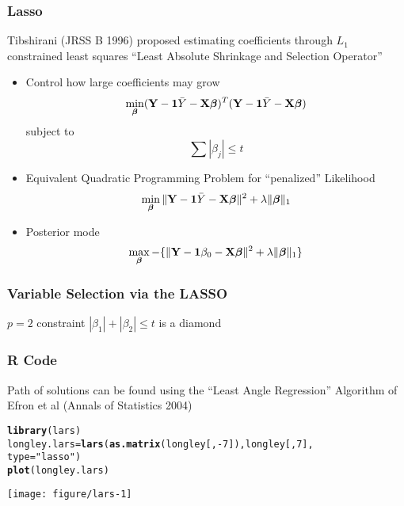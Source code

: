 \documentclass[handout]{beamer}\usepackage[]{graphicx}\usepackage[]{color}
\makeatletter
\def\maxwidth{ %
  \ifdim\Gin@nat@width>\linewidth
    \linewidth
  \else
    \Gin@nat@width
  \fi
}
\newcommand{\hlnum}[1]{\textcolor[rgb]{0.686,0.059,0.569}{#1}}%
\newcommand{\hlstr}[1]{\textcolor[rgb]{0.192,0.494,0.8}{#1}}%
\newcommand{\hlopt}[1]{\textcolor[rgb]{0,0,0}{#1}}%
\newcommand{\hlstd}[1]{\textcolor[rgb]{0.345,0.345,0.345}{#1}}%
\newcommand{\hlkwb}[1]{\textcolor[rgb]{0.69,0.353,0.396}{#1}}%
\newcommand{\hlkwc}[1]{\textcolor[rgb]{0.333,0.667,0.333}{#1}}%
\newcommand{\hlkwd}[1]{\textcolor[rgb]{0.737,0.353,0.396}{\textbf{#1}}}%
\newenvironment{kframe}{%
 \def\at@end@of@kframe{}%
 \ifinner\ifhmode%
  \def\at@end@of@kframe{\end{minipage}}%
  \begin{minipage}{\columnwidth}%
 \fi\fi%
 \def\FrameCommand##1{\hskip\@totalleftmargin \hskip-\fboxsep
 \colorbox{shadecolor}{##1}\hskip-\fboxsep
     \hskip-\linewidth \hskip-\@totalleftmargin \hskip\columnwidth}%
 \MakeFramed {\advance\hsize-\width
   \@totalleftmargin\z@ \linewidth\hsize
   \@setminipage}}%
 {\par\unskip\endMakeFramed%
 \at@end@of@kframe}
\newenvironment{knitrout}{}{} %
\makeatother
\begin{document}
\begin{frame}
  \frametitle{Lasso}
Tibshirani (JRSS B 1996) proposed estimating coefficients through
$L_1$ constrained least squares  ``Least Absolute Shrinkage and
Selection Operator''  \pause
\begin{itemize}
 \item Control how large coefficients may grow \pause
    $$\min_{\boldsymbol{\beta}} (\mathbf{Y} - \mathbf{1} \bar{Y} - \mathbf{X} \boldsymbol{\beta})^T (\mathbf{Y} -  \mathbf{1} \bar{Y} - \mathbf{X}\boldsymbol{\beta})$$
    subject to
    $$ \sum |\beta_j| \le t$$ \pause
  \item Equivalent Quadratic Programming Problem for ``penalized'' Likelihood
    $$\min_{\boldsymbol{\beta}} \| \mathbf{Y} -\mathbf{1}\bar{Y} - \mathbf{X} \boldsymbol{\beta}\|^2 + \lambda \|\boldsymbol{\beta}\|_1$$ \pause
  \item Posterior mode
  $$
\max_{\boldsymbol{\beta}} - \{ \| \mathbf{Y} -\mathbf{1} \beta_0 - \mathbf{X} \boldsymbol{\beta}\|^2 + \lambda \|\boldsymbol{\beta}\|_1 \}
$$
\end{itemize}
\end{frame}

\begin{frame}  \frametitle{Variable Selection via the LASSO }
$p = 2$  constraint $|\beta_1| + |\beta_2| \le t$ is a diamond

\vfill


\end{frame}


\begin{frame}\frametitle[fragile]{R Code}
Path of solutions can be found using the
   ``Least Angle Regression'' Algorithm of Efron et al (Annals of
   Statistics 2004)   \pause



\begin{knitrout}
\color{fgcolor}\begin{kframe}
\begin{alltt}
\hlkwd{library}\hlstd{(lars)}
\hlstd{longley.lars} \hlkwb{=} \hlkwd{lars}\hlstd{(}\hlkwd{as.matrix}\hlstd{(longley[,}\hlopt{-}\hlnum{7}\hlstd{]), longley[,}\hlnum{7}\hlstd{],}
                 \hlkwc{type}\hlstd{=}\hlstr{"lasso"}\hlstd{)}
\hlkwd{plot}\hlstd{(longley.lars)}
\end{alltt}
\end{kframe}

{\centering \texttt{[image: figure/lars-1]} 

}



\end{knitrout}
\end{frame}
\end{document}
